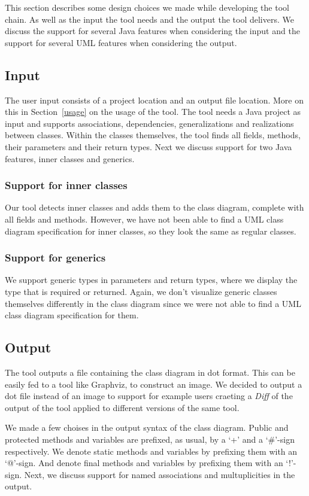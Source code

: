 This section describes some design choices we made while developing the tool chain. 
As well as the input the tool needs and the output the tool delivers. 
We discuss the support for several Java features when considering the input and the support for several UML features when considering the output.

\subsection{Input}
	The user input consists of a project location and an output file location. 
	More on this in Section~\ref{usage} on the usage of the tool.
	The tool needs a Java project as input and supports associations, dependencies, generalizations and realizations between classes. 
	Within the classes themselves, the tool finds all fields, methods, their parameters and their return types.	
	Next we discuss support for two Java features, inner classes and generics.

	\subsubsection{Support for inner classes}
		Our tool detects inner classes and adds them to the class diagram, complete with all fields and methods. 
		However, we have not been able to find a UML class diagram specification for inner classes, so they look the same as regular classes.
		
	\subsubsection{Support for generics}
		We support generic types in parameters and return types, where we display the type that is required or returned.
		Again, we don't visualize generic classes themselves differently in the class diagram since we were not able to find a UML class diagram specification for them.

\subsection{Output}
	The tool outputs a file containing the class diagram in dot format. 
	This can be easily fed to a tool like Graphviz, to construct an image.
	We decided to output a dot file instead of an image to support for example users craeting a \textit{Diff} of the output of the tool 	applied to different versions of the same tool.
	
	We made a few choises in the output syntax of the class diagram. 
	Public and protected methods and variables are prefixed, as usual, by a `+' and a `\#'-sign respectively.
	We denote static methods and variables by prefixing them with an `@'-sign.
	And denote final methods and variables by prefixing them with an `!'-sign.	
	Next, we discuss support for named associations and multuplicities in the output.

